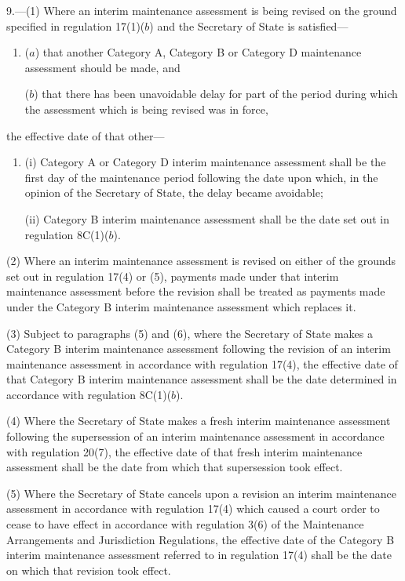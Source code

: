 \documentclass[a4paper,12pt]{article}
\begin{document}
9.—(1) Where an interim maintenance assessment is being revised on the ground specified in regulation 17(1)($b$) and the Secretary of State is satisfied---
\begin{enumerate}\item[]
($a$) that another Category A, Category B or Category D maintenance assessment should be made, and

($b$) that there has been unavoidable delay for part of the period during which the assessment which is being revised was in force,
\end{enumerate}
the effective date of that other---
\begin{enumerate}\item[]
(i) Category A or Category D interim maintenance assessment shall be the first day of the maintenance period following the date upon which, in the opinion of the Secretary of State, the delay became avoidable;

(ii) Category B interim maintenance assessment shall be the date set out in regulation 8C(1)($b$).
\end{enumerate}

(2) Where an interim maintenance assessment is revised on either of the grounds set out in regulation 17(4) or (5), payments made under that interim maintenance assessment before the revision shall be treated as payments made under the Category B interim maintenance assessment which replaces it.

(3) Subject to paragraphs (5) and (6), where the Secretary of State makes a Category B interim maintenance assessment following the revision of an interim maintenance assessment in accordance with regulation 17(4), the effective date of that Category B interim maintenance assessment shall be the date determined in accordance with regulation 8C(1)($b$).

(4) Where the Secretary of State makes a fresh interim maintenance assessment following the supersession of an interim maintenance assessment in accordance with regulation 20(7), the effective date of that fresh interim maintenance assessment shall be the date from which that supersession took effect.

(5) Where the Secretary of State cancels upon a revision an interim maintenance assessment in accordance with regulation 17(4) which caused a court order to cease to have effect in accordance with regulation 3(6) of the Maintenance Arrangements and Jurisdiction Regulations, the effective date of the Category B interim maintenance assessment referred to in regulation 17(4) shall be the date on which that revision took effect.
\end{document}
